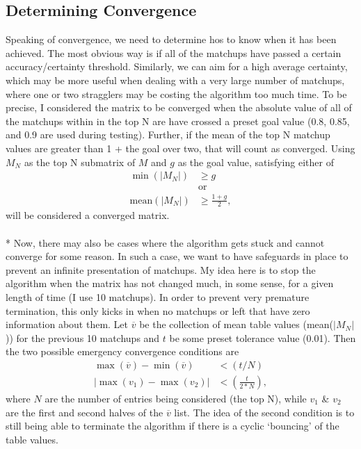 \documentclass[11pt]{article}
\begin{document}
\subsection{Determining Convergence}
\noindent Speaking of convergence, we need to determine hos to know when it has been achieved. The most obvious way is if all of the matchups have passed a certain accuracy/certainty threshold. Similarly, we can aim for a high average certainty, which may be more useful when dealing with a very large number of matchups, where one or two stragglers may be costing the algorithm too much time. To be precise, I considered the matrix to be converged when the absolute value of all of the matchups within in the top N are have crossed a preset goal value (0.8, 0.85, and 0.9 are used during testing). Further, if the mean of the top N matchup values are greater than 1 + the goal over two, that will count as converged. Using $M_N$ as the top N submatrix of $M$ and $g$ as the goal value, satisfying either of 
\begin{align}
\min\left(\left|M_{N}\right|\right) &\geq g\\
&\textrm{or} \\
\textrm{mean}\left(\left|M_N\right|\right) &\geq \frac{1+g}{2},
\end{align}
will be considered a converged matrix.  
\\
\\*
Now, there may also be cases where the algorithm gets stuck and cannot converge for some reason. In such a case, we want to have safeguards in place to prevent an infinite presentation of matchups. My idea here is to stop the algorithm when the matrix has not changed much, in some sense, for a given length of time (I use 10 matchups). In order to prevent very premature termination, this only kicks in when no matchups or left that have zero information about them. Let $\overline{v}$ be the collection of mean table values (mean($|M_N|$)) for the previous 10 matchups and $t$ be some preset tolerance value (0.01). Then the two possible emergency convergence conditions are 
\begin{align}
\max(\overline{v}) -\min(\overline{v}) &< (t/N) \\
\left|\max(v_1)-\max(v_2)\right| &<\left(\frac{t}{2*N}\right),
\end{align}
where $N$ are the number of entries being considered (the top N), while $v_1$ \& $v_2$ are the first and second halves of the $\overline{v}$ list. The idea of the second condition is to still being able to terminate the algorithm if there is a cyclic `bouncing' of the table values. 
\end{document}
